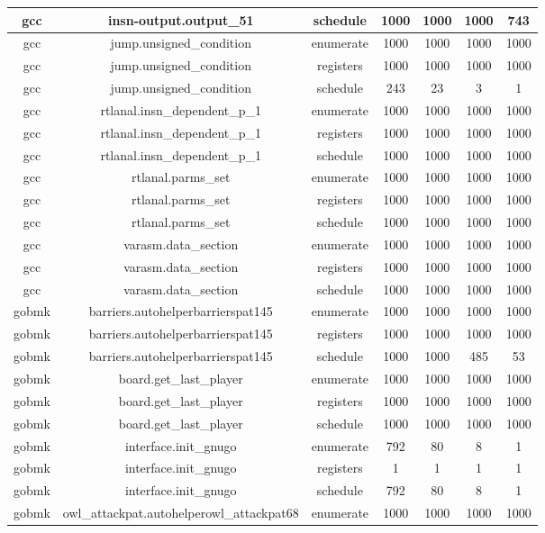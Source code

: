 \begin{center}
\begin{longtable}{c|c|c|c|c|c|c}
		gcc & insn-output.output\_51 & schedule & 1000 & 1000 & 1000 & 743 \\
		\hline
		gcc & jump.unsigned\_condition & enumerate & 1000 & 1000 & 1000 & 1000 \\
		gcc & jump.unsigned\_condition & registers & 1000 & 1000 & 1000 & 1000 \\
		gcc & jump.unsigned\_condition & schedule & 243 & 23 & 3 & 1 \\
		\hline
		gcc & rtlanal.insn\_dependent\_p\_1 & enumerate & 1000 & 1000 & 1000 & 1000 \\
		gcc & rtlanal.insn\_dependent\_p\_1 & registers & 1000 & 1000 & 1000 & 1000 \\
		gcc & rtlanal.insn\_dependent\_p\_1 & schedule & 1000 & 1000 & 1000 & 1000 \\
		\hline
		gcc & rtlanal.parms\_set & enumerate & 1000 & 1000 & 1000 & 1000 \\
		gcc & rtlanal.parms\_set & registers & 1000 & 1000 & 1000 & 1000 \\
		gcc & rtlanal.parms\_set & schedule & 1000 & 1000 & 1000 & 1000 \\
		\hline
		gcc & varasm.data\_section & enumerate & 1000 & 1000 & 1000 & 1000 \\
		gcc & varasm.data\_section & registers & 1000 & 1000 & 1000 & 1000 \\
		gcc & varasm.data\_section & schedule & 1000 & 1000 & 1000 & 1000 \\
		\hline
		gobmk & barriers.autohelperbarrierspat145 & enumerate & 1000 & 1000 & 1000 & 1000 \\
		gobmk & barriers.autohelperbarrierspat145 & registers & 1000 & 1000 & 1000 & 1000 \\
		gobmk & barriers.autohelperbarrierspat145 & schedule & 1000 & 1000 & 485 & 53 \\
		\hline
		gobmk & board.get\_last\_player & enumerate & 1000 & 1000 & 1000 & 1000 \\
		gobmk & board.get\_last\_player & registers & 1000 & 1000 & 1000 & 1000 \\
		gobmk & board.get\_last\_player & schedule & 1000 & 1000 & 1000 & 1000 \\
		\hline
		gobmk & interface.init\_gnugo & enumerate & 792 & 80 & 8 & 1 \\
		gobmk & interface.init\_gnugo & registers & 1 & 1 & 1 & 1 \\
		gobmk & interface.init\_gnugo & schedule & 792 & 80 & 8 & 1 \\
		\hline
		gobmk & owl\_attackpat.autohelperowl\_attackpat68 & enumerate & 1000 & 1000 & 1000 & 1000 \\

\end{longtable}
\end{center}
